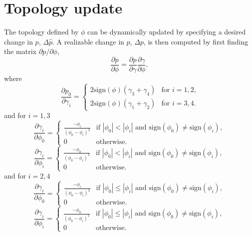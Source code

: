 \documentclass{article}
\begin{document}
\section{Topology update}
The topology defined by $\phi$ can be dynamically updated by specifying a desired change in $p$, $\Delta \hat{p}$. A realizable change in $p$, $\Delta p$, is then computed by first finding the matrix $\partial p / \partial \phi$, 
\begin{equation}
    \frac{\partial p}{\partial \phi} = 
    \frac{\partial p}{\partial \gamma} \frac{\partial \gamma}{\partial \phi},
\end{equation}
where
\begin{equation}
    \frac{\partial p_0}{\partial \gamma_i} = 
    \begin{cases}
        2\text{sign}(\phi)(\gamma_3 + \gamma_4) & \text{for $i = 1,2$,} \\
        2\text{sign}(\phi)(\gamma_1 + \gamma_2) & \text{for $i = 3,4$.} 
    \end{cases}
\end{equation}
and for $i = 1,3$
\begin{equation}
    \frac{\partial \gamma_i}{\partial \phi_0} = 
    \begin{cases}
        \frac{-\phi_i}{(\phi_0 - \phi_i)^2} & 
            \text{if } |\phi_0| < |\phi_i| \text{ and } 
            \text{sign}(\phi_0) \ne \text{sign}(\phi_i), \\
        0 & \text{otherwise.}
    \end{cases}
\end{equation}
\begin{equation}
    \frac{\partial \gamma_i}{\partial \phi_i} = 
    \begin{cases}
        \frac{-\phi_0}{(\phi_0 - \phi_i)^2} & 
            \text{if } |\phi_0| < |\phi_i| \text{ and } 
            \text{sign}(\phi_0) \ne \text{sign}(\phi_i), \\
        0 & \text{otherwise.}
    \end{cases}
\end{equation}
and for $i = 2,4$
\begin{equation}
    \frac{\partial \gamma_i}{\partial \phi_0} = 
    \begin{cases}
        \frac{-\phi_i}{(\phi_0 - \phi_i)^2} & 
            \text{if } |\phi_0| \le |\phi_i| \text{ and } 
            \text{sign}(\phi_0) \ne \text{sign}(\phi_i), \\
        0 & \text{otherwise.}
    \end{cases}
\end{equation}
\begin{equation}
    \frac{\partial \gamma_i}{\partial \phi_i} = 
    \begin{cases}
        \frac{-\phi_0}{(\phi_0 - \phi_i)^2} & 
            \text{if } |\phi_0| \le |\phi_i| \text{ and } 
            \text{sign}(\phi_0) \ne \text{sign}(\phi_i), \\
        0 & \text{otherwise.}
    \end{cases}
\end{equation}
\end{document}
